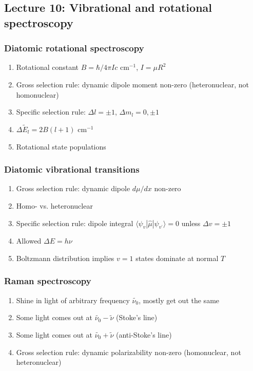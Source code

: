 \documentclass[11pt]{article}
\begin{document}
\subsection{Lecture 10: Vibrational and rotational spectroscopy}
\label{sec:org3266139}
\subsubsection{Diatomic rotational spectroscopy}
\label{sec:org67d8daf}
\begin{enumerate}
\item Rotational constant \(B = \hbar/4\pi I c\) cm\(^{-1}\), \(I=\mu R^2\)
\item Gross selection rule: dynamic dipole moment non-zero (heteronuclear, not homonuclear)
\item Specific selection rule: \(\Delta l=\pm 1\), \(\Delta m_l=0, \pm1\)
\item \(\Delta \tilde E_l  = 2B(l+1)\) cm\(^{-1}\)
\item Rotational state populations
\end{enumerate}
\subsubsection{Diatomic vibrational transitions}
\label{sec:org35f2bfa}
\begin{enumerate}
\item Gross selection rule: dynamic dipole \(d\mu/dx\) non-zero
\item Homo- vs. heteronuclear
\item Specific selection rule: dipole integral \(\langle \psi_v|\hat\mu|\psi_{v^\prime} \rangle =0\)
unless \(\Delta v = \pm 1\)
\item Allowed \(\Delta E = h\nu\)
\item Boltzmann distribution implies \(v=1\) states dominate at normal \(T\)
\end{enumerate}
\subsubsection{Raman spectroscopy}
\label{sec:org24370ff}
\begin{enumerate}
\item Shine in light of arbitrary frequency \(\tilde{\nu_0}\), mostly get out the same
\item Some light comes out at \(\tilde{\nu_0}-\tilde{\nu}\) (Stoke's line)
\item Some light comes out at \(\tilde{\nu_0}+\tilde{\nu}\) (anti-Stoke's line)
\item Gross selection rule: dynamic polarizability non-zero (homonuclear, not heteronuclear)
\end{enumerate}
\end{document}
